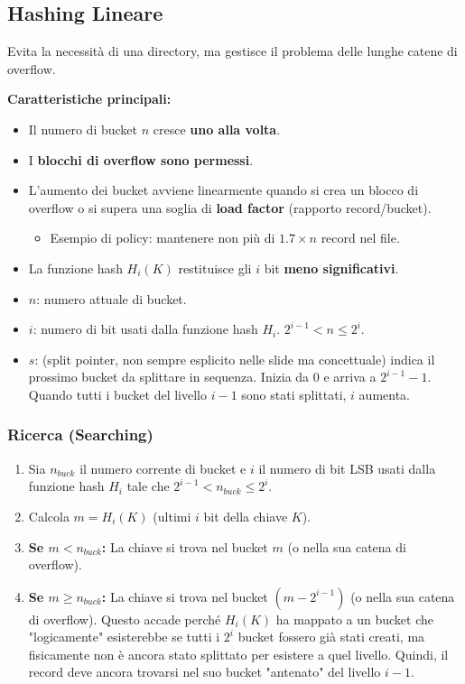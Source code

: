\subsection{Hashing Lineare}
Evita la necessità di una directory, ma gestisce il problema delle lunghe catene di overflow.

\textbf{Caratteristiche principali:}
\begin{itemize}
    \item Il numero di bucket $n$ cresce \textbf{uno alla volta}.
    \item I \textbf{blocchi di overflow sono permessi}.
    \item L'aumento dei bucket avviene linearmente quando si crea un blocco di overflow o si supera una soglia di \textbf{load factor} (rapporto record/bucket).
    \begin{itemize}
        \item Esempio di policy: mantenere non più di $1.7 \times n$ record nel file.
    \end{itemize}
    \item La funzione hash $H_i(K)$ restituisce gli $i$ bit \textbf{meno significativi}.
    \item $n$: numero attuale di bucket.
    \item $i$: numero di bit usati dalla funzione hash $H_i$. $2^{i-1} < n \le 2^i$.
    \item $s$: (split pointer, non sempre esplicito nelle slide ma concettuale) indica il prossimo bucket da splittare in sequenza. Inizia da 0 e arriva a $2^{i-1} - 1$. Quando tutti i bucket del livello $i-1$ sono stati splittati, $i$ aumenta.
\end{itemize}

\subsubsection{Ricerca (Searching)}
\begin{enumerate}
    \item Sia $n_{buck}$ il numero corrente di bucket e $i$ il numero di bit LSB usati dalla funzione hash $H_i$ tale che $2^{i-1} < n_{buck} \le 2^i$.
    \item Calcola $m = H_i(K)$ (ultimi $i$ bit della chiave $K$).
    \item \textbf{Se $m < n_{buck}$:} La chiave si trova nel bucket $m$ (o nella sua catena di overflow).
    \item \textbf{Se $m \ge n_{buck}$:} La chiave si trova nel bucket $(m - 2^{i-1})$ (o nella sua catena di overflow). Questo accade perché $H_i(K)$ ha mappato a un bucket che "logicamente" esisterebbe se tutti i $2^i$ bucket fossero già stati creati, ma fisicamente non è ancora stato splittato per esistere a quel livello. Quindi, il record deve ancora trovarsi nel suo bucket "antenato" del livello $i-1$.
\end{enumerate}

